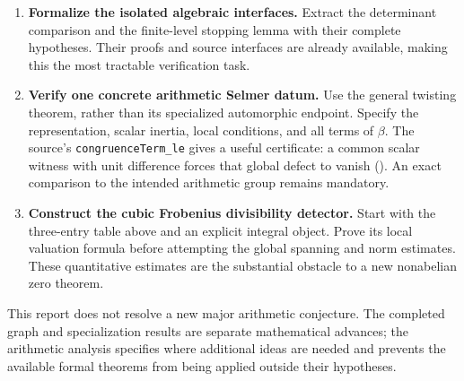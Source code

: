 \begin{enumerate}
\item \textbf{Formalize the isolated algebraic interfaces.}
Extract the determinant comparison and the finite-level stopping lemma
with their complete hypotheses. Their proofs and source interfaces are
already available, making this the most tractable verification task.
\item \textbf{Verify one concrete arithmetic Selmer datum.}
Use the general twisting theorem, rather than its specialized
automorphic endpoint. Specify the representation, scalar inertia,
local conditions, and all terms of $\beta$. The source's
\texttt{congruenceTerm\_le} gives a useful certificate: a common scalar
witness with unit difference forces that global defect to vanish
().
An exact comparison to the intended arithmetic group remains mandatory.
\item \textbf{Construct the cubic Frobenius divisibility detector.}
Start with the three-entry table above and an explicit integral object.
Prove its local valuation formula before attempting the global
spanning and norm estimates. These quantitative estimates are the
substantial obstacle to a new nonabelian zero theorem.
\end{enumerate}

This report does not resolve a new major arithmetic conjecture.
The completed graph and specialization results are separate mathematical
advances; the arithmetic analysis specifies where additional ideas are
needed and prevents the available formal theorems from being applied
outside their hypotheses.
